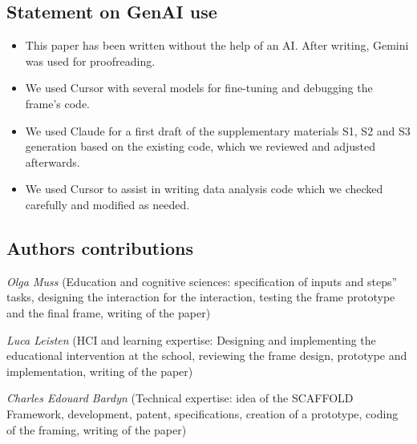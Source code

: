 \documentclass[fleqn,10pt]{wlscirep}
\begin{document}
\subsection*{Statement on GenAI use}

\begin{itemize}
\item This paper has been written without the help of an AI. After writing, Gemini was used for proofreading.
\item We used Cursor with several models for fine-tuning and debugging the frame's code.
\item We used Claude for a first draft of the supplementary materials S1, S2 and S3 generation based on the existing code, which we reviewed and adjusted afterwards.
\item We used Cursor to assist in writing data analysis code which we checked carefully and modified as needed.
\end{itemize}

\subsection*{Authors contributions}

\textit{Olga Muss} (Education and cognitive sciences: specification of inputs and steps'' tasks, designing the interaction for the interaction, testing the frame prototype and the final frame, writing of the paper)

\textit{Luca Leisten} (HCI and learning expertise: Designing and implementing the educational intervention at the school, reviewing the frame design, prototype and implementation, writing of the paper)

\textit{Charles Edouard Bardyn} (Technical expertise: idea of the SCAFFOLD Framework, development, patent, specifications, creation of a prototype, coding of the framing, writing of the paper)
\end{document}
